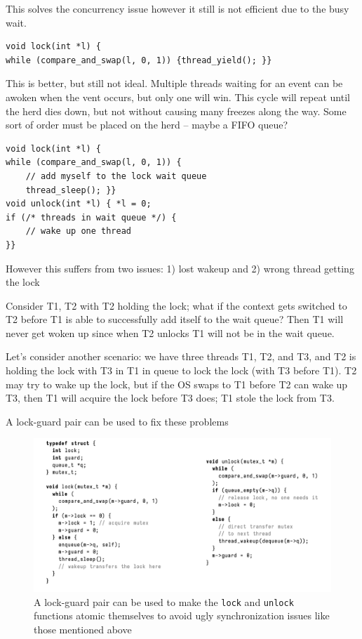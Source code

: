 \documentclass[../notes.tex]{subfiles}
\begin{document}
This solves the concurrency issue however it still is not efficient due to the busy wait.

\begin{listing}[H]
\begin{verbatim}
void lock(int *l) {
while (compare_and_swap(l, 0, 1)) {thread_yield(); }}
\end{verbatim}
\end{listing}

This is better, but still not ideal. Multiple threads waiting for an event can be awoken when the vent occurs, but only one will win. This cycle will repeat until the herd dies down, but not without causing many freezes along the way. Some sort of order must be placed on the herd -- maybe a FIFO queue?


\begin{listing}[H]
\begin{verbatim}
void lock(int *l) {
while (compare_and_swap(l, 0, 1)) {
    // add myself to the lock wait queue
    thread_sleep(); }}
void unlock(int *l) { *l = 0;
if (/* threads in wait queue */) {
    // wake up one thread
}}
\end{verbatim}
\end{listing}

However this suffers from two issues: 1) lost wakeup and 2) wrong thread getting the lock

Consider T1, T2 with T2 holding the lock; what if the context gets switched to T2 before T1 is able to successfully add itself to the wait queue? Then T1 will never get woken up since when T2 unlocks T1 will not be in the wait queue.

Let's consider another scenario: we have three threads T1, T2, and T3, and T2 is holding the lock with T3 in T1 in queue to lock the lock (with T3 before T1). 
T2 may try to wake up the lock, but if the OS swaps to T1 before T2 can wake up T3, then T1 will acquire the lock before T3 does; T1 stole the lock from T3.


A lock-guard pair can be used to fix these problems


\begin{figure}[H]
    \centering
    \includegraphics[width=0.8\linewidth]{img/image_2023-03-08-13-52-58.png}
    \caption{A lock-guard pair can be used to make the \texttt{lock} and \texttt{unlock} functions atomic themselves to avoid ugly synchronization issues like those mentioned above}
\end{figure}
\end{document}
